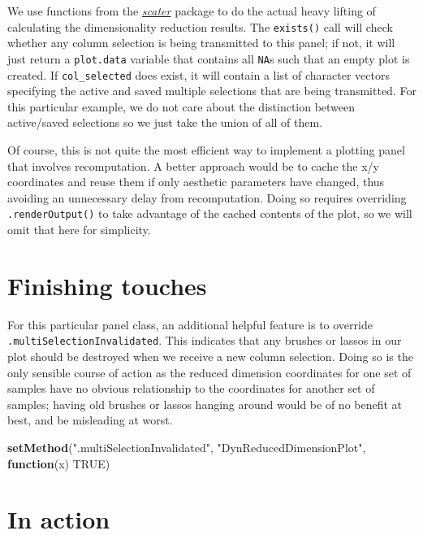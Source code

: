 \documentclass[]{book}
\newenvironment{Shaded}{\begin{snugshade}}{\end{snugshade}}
\newcommand{\KeywordTok}[1]{\textcolor[rgb]{0.13,0.29,0.53}{\textbf{#1}}}
\newcommand{\StringTok}[1]{\textcolor[rgb]{0.31,0.60,0.02}{#1}}
\newcommand{\OtherTok}[1]{\textcolor[rgb]{0.56,0.35,0.01}{#1}}
\newcommand{\ControlFlowTok}[1]{\textcolor[rgb]{0.13,0.29,0.53}{\textbf{#1}}}
\newcommand{\NormalTok}[1]{#1}
\begin{document}
We use functions from the
\emph{\href{https://bioconductor.org/packages/3.11/scater}{scater}}
package to do the actual heavy lifting of calculating the dimensionality
reduction results. The \texttt{exists()} call will check whether any
column selection is being transmitted to this panel; if not, it will
just return a \texttt{plot.data} variable that contains all \texttt{NA}s
such that an empty plot is created. If \texttt{col\_selected} does
exist, it will contain a list of character vectors specifying the active
and saved multiple selections that are being transmitted. For this
particular example, we do not care about the distinction between
active/saved selections so we just take the union of all of them.

Of course, this is not quite the most efficient way to implement a
plotting panel that involves recomputation. A better approach would be
to cache the x/y coordinates and reuse them if only aesthetic parameters
have changed, thus avoiding an unnecessary delay from recomputation.
Doing so requires overriding \texttt{.renderOutput()} to take advantage
of the cached contents of the plot, so we will omit that here for
simplicity.

\section{Finishing touches}\label{finishing-touches}

For this particular panel class, an additional helpful feature is to
override \texttt{.multiSelectionInvalidated}. This indicates that any
brushes or lassos in our plot should be destroyed when we receive a new
column selection. Doing so is the only sensible course of action as the
reduced dimension coordinates for one set of samples have no obvious
relationship to the coordinates for another set of samples; having old
brushes or lassos hanging around would be of no benefit at best, and be
misleading at worst.

\begin{Shaded}
\begin{Highlighting}[]
\KeywordTok{setMethod}\NormalTok{(}\StringTok{".multiSelectionInvalidated"}\NormalTok{, }\StringTok{"DynReducedDimensionPlot"}\NormalTok{, }\ControlFlowTok{function}\NormalTok{(x) }\OtherTok{TRUE}\NormalTok{)}
\end{Highlighting}
\end{Shaded}

\section{In action}\label{in-action}
\end{document}
